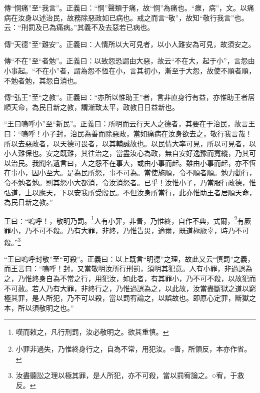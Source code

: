 {\noindent\zhuan{}\fzbyks 傳“恫痛”至“我言”。正義曰：“恫”聲類于痛，故“恫”為痛也。“瘝，病”，文。以痛病在汝身以述治民，故務除惡政如已病也。戒之而言“敬”，故知“敬行我言”也。云：“刑罰及已為痛病。”其義不及去惡若已病也。 \par}

{\noindent\zhuan{}\fzbyks 傳“天德”至“難安”。正義曰：人情所以大可見者，以小人難安為可見，故須安之。 \par}

{\noindent\zhuan{}\fzbyks 傳“不在”至“者勉”。正義曰：以致怨恐謂由大惡，故云“不在大，起于小”，言怨由小事起。“不在小”者，謂為怨不恆在小，言其初小，漸至于大怨，故使不順者順，不勉者勉，其怨自消也。 \par}

{\noindent\zhuan{}\fzbyks 傳“弘王”至“之教”。正義曰：“亦所以惟助王”者，言非直身行有益，亦惟助王者居順天命，為民日新之教，謂漸致太平，政教日日益新也。 \par}

{\noindent\shu{}\fzkt “王曰嗚呼小”至“新民”。正義曰：所明而云行天人之德者，其要在于治民，故言王曰：“嗚呼！小子封，治民為善而除惡政，當如痛病在汝身欲去之，敬行我言哉！所以去惡政者，以天德可畏者，以其輔誠故也。以民情大率可見，所以可見者，以小人難保也。安之既難，其往治之，當盡汝心為政，無自安好逸豫而寬縱，乃其可以治民。我聞名遺言曰，人之怨不在事大，或由小事而起。雖由小事而起，亦不恆在事小，因小至大。是為民所怨，事不可為。當使施順，令不順者順。勉力勸行，令不勉者勉。則其怨小大都消，令汝消怨者。已乎！汝惟小子，乃當服行政德，惟弘道，上以應天，下以安我所受殷民。不但汝身所當行，此亦惟助王者居順天命，為民日新之教。” \par}

王曰：“嗚呼！，敬明乃罰。\footnote{嘆而敕之，凡行刑罰，汝必敬明之。欲其重慎。}人有小罪，非眚，乃惟終，自作不典，式爾，\footnote{小罪非過失，乃惟終身行之，自為不常，用犯汝。○眚，所領反，本亦作省。}有厥罪小，乃不可不殺。乃有大罪，非終，乃惟眚災，適爾，既道極厥辜，時乃不可殺。”\footnote{汝盡聽訟之理以極其罪，是人所犯，亦不可殺，當以罰宥論之。○宥，于救反。}

{\noindent\shu{}\fzkt “王曰嗚呼封敬”至“可殺”。正義曰：以上既言“明德”之理，故此又云“慎罰”之義，而王言曰：“嗚呼！封，又當敬明汝所行刑罰，須明其犯意。人有小罪，非過誤為之，乃惟終身自為不常之行，用犯汝，如此者，有其罪小，乃不可不殺，以故犯而不可赦。若人乃有大罪，非終行之，乃惟過誤為之，以此故，汝當盡斷獄之道以窮極其罪，是人所犯，乃不可以殺，當以罰宥論之，以誤故也。即原心定罪，斷獄之本，所以須敬明之也。” \par}


